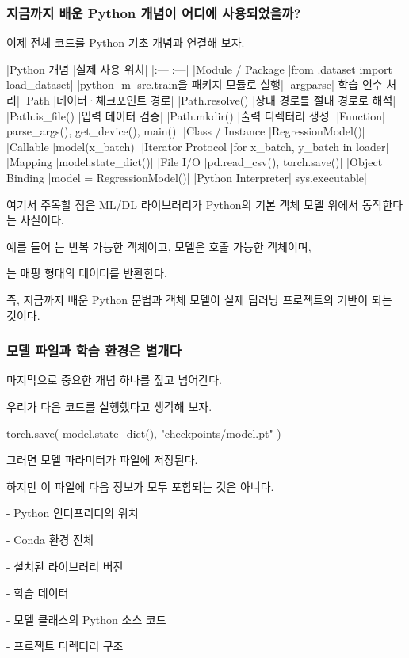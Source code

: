 \subsubsection{지금까지 배운 Python 개념이 어디에 사용되었을까?}

이제 전체 코드를 Python 기초 개념과 연결해 보자.

\begin{dhktable}
|Python 개념	|실제 사용 위치|
|:---|:---|
|Module / Package	|from .dataset import load_dataset|
|python -m	|src.train을 패키지 모듈로 실행|
|argparse|	학습 인수 처리|
|Path	|데이터·체크포인트 경로|
|Path.resolve()	|상대 경로를 절대 경로로 해석|
|Path.is_file()	|입력 데이터 검증|
|Path.mkdir()	|출력 디렉터리 생성|
|Function|	parse_args(), get_device(), main()|
|Class / Instance	|RegressionModel()|
|Callable	|model(x_batch)|
|Iterator Protocol	|for x_batch, y_batch in loader|
|Mapping	|model.state_dict()|
|File I/O	|pd.read_csv(), torch.save()|
|Object Binding	|model = RegressionModel()|
|Python Interpreter|	sys.executable|
\end{dhktable}

여기서 주목할 점은 ML/DL 라이브러리가 Python의 기본 객체 모델 위에서 동작한다는 사실이다.

예를 들어 는 반복 가능한 객체이고, 모델은 호출 가능한 객체이며,

는 매핑 형태의 데이터를 반환한다.

즉, 지금까지 배운 Python 문법과 객체 모델이 실제 딥러닝 프로젝트의 기반이 되는 것이다.

\subsubsection{모델 파일과 학습 환경은 별개다}

마지막으로 중요한 개념 하나를 짚고 넘어간다.

우리가 다음 코드를 실행했다고 생각해 보자.

\begin{dhkcode}
torch.save(
    model.state_dict(),
    "checkpoints/model.pt"
)
\end{dhkcode}

그러면 모델 파라미터가 파일에 저장된다.

하지만 이 파일에 다음 정보가 모두 포함되는 것은 아니다.

\begin{dhksmry}
    - Python 인터프리터의 위치

    - Conda 환경 전체

    - 설치된 라이브러리 버전

    - 학습 데이터

    - 모델 클래스의 Python 소스 코드

    - 프로젝트 디렉터리 구조
\end{dhksmry}

